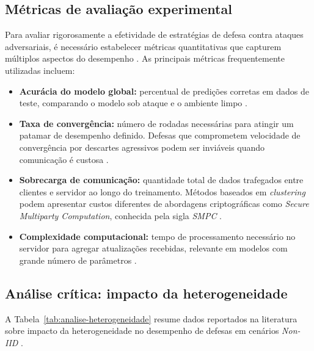 \subsection{Métricas de avaliação experimental}
\label{subsec:metricas-avaliacao}

Para avaliar rigorosamente a efetividade de estratégias de defesa contra ataques adversariais, é necessário estabelecer métricas quantitativas que capturem múltiplos aspectos do desempenho \cite{Khan2023}. As principais métricas frequentemente utilizadas incluem:

\begin{itemize}
    \item \textbf{Acurácia do modelo global:} percentual de predições corretas em dados de teste, comparando o modelo sob ataque e o ambiente limpo \cite{Almutairi2024}.

    \item \textbf{Taxa de convergência:} número de rodadas necessárias para atingir um patamar de desempenho definido. Defesas que comprometem velocidade de convergência por descartes agressivos podem ser inviáveis quando comunicação é custosa \cite{Kairouz2021}.

    \item \textbf{Sobrecarga de comunicação:} quantidade total de dados trafegados entre clientes e servidor ao longo do treinamento. Métodos baseados em \textit{clustering} podem apresentar custos diferentes de abordagens criptográficas como \textit{Secure Multiparty Computation}, conhecida pela sigla \textit{SMPC} \cite{Moshawrab2023}.

    \item \textbf{Complexidade computacional:} tempo de processamento necessário no servidor para agregar atualizações recebidas, relevante em modelos com grande número de parâmetros \cite{Li2020}.
\end{itemize}

\subsection{Análise crítica: impacto da heterogeneidade}
\label{subsec:analise-critica-heterogeneidade}

A Tabela~\ref{tab:analise-heterogeneidade} resume dados reportados na literatura sobre impacto da heterogeneidade no desempenho de defesas em cenários \textit{Non-IID} \cite{Blanchard2017,Yin2018,Li2023,Xu2024}.


